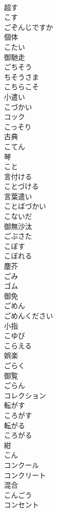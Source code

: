 \documentclass[8pt]{extreport}
\begin{document}
\begin{CJK}{UTF8}{min}
\\	超す 
\\	こす	
\\	ごぞんじですか	
\\	個体 
\\	こたい	
\\	御馳走 
\\	ごちそう	
\\	ちそうさま	
\\	こちらこそ	
\\	小遣い 
\\	こづかい	
\\	コック	
\\	こっそり	
\\	古典 
\\	こてん	
\\	琴 
\\	こと	
\\	言付ける 
\\	ことづける	
\\	言葉遣い 
\\	ことばづかい	
\\	こないだ	
\\	御無沙汰 
\\	ごぶさた	
\\	こぼす	
\\	こぼれる	
\\	塵芥 
\\	ごみ	
\\	ゴム	
\\	御免 
\\	ごめん	
\\	ごめんください	
\\	小指 
\\	こゆび	
\\	こらえる	
\\	娯楽 
\\	ごらく	
\\	御覧 
\\	ごらん	
\\	コレクション	
\\	転がす 
\\	ころがす	
\\	転がる 
\\	ころがる	
\\	紺 
\\	こん	
\\	コンクール 
\\	コンクリート	
\\	混合 
\\	こんごう	
\\	コンセント	

\end{CJK}
\end{document}
